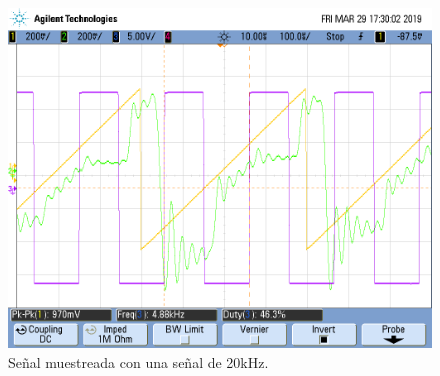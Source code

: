 \documentclass[../../ASSD_TP1_G7.tex]{subfiles}
\begin{document}
\begin{figure}[H]
\begin{centering}
\includegraphics[scale=0.3]{Imagenes/yh_pt6d_cuad2}
\par\end{centering}
\caption{Señal muestreada con una señal de 20kHz.}
\end{figure}
\end{document}
